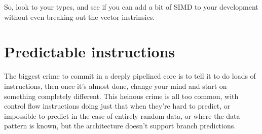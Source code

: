 So, look to your types, and see if you can add a bit of SIMD to your
development without even breaking out the vector instrinsics.

\section{Predictable instructions}

The biggest crime to commit in a deeply pipelined core is to tell it to do
loads of instructions, then once it's almost done, change your mind and start
on something completely different. This heinous crime is all too common, with
control flow instructions doing just that when they're hard to predict, or
impossible to predict in the case of entirely random data, or where the data
pattern is known, but the architecture doesn't support branch predictions.

